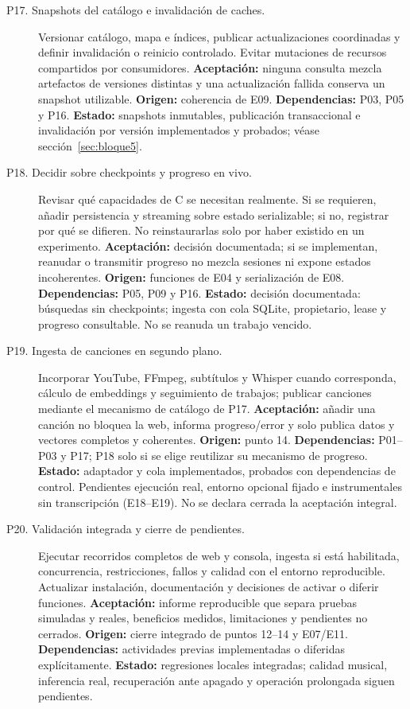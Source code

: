 \begin{description}
\item[P17. Snapshots del catálogo e invalidación de caches.]
Versionar catálogo, mapa e índices, publicar actualizaciones coordinadas y
definir invalidación o reinicio controlado. Evitar mutaciones de recursos
compartidos por consumidores.
\textbf{Aceptación:} ninguna consulta mezcla artefactos de versiones distintas
y una actualización fallida conserva un snapshot utilizable.
\textbf{Origen:} coherencia de E09. \textbf{Dependencias:} P03, P05 y P16.
\textbf{Estado:} snapshots inmutables, publicación transaccional e invalidación por
versión implementados y probados; véase sección~\ref{sec:bloque5}.

\item[P18. Decidir sobre checkpoints y progreso en vivo.]
Revisar qué capacidades de C se necesitan realmente. Si se requieren, añadir
persistencia y streaming sobre estado serializable; si no, registrar por qué
se difieren. No reinstaurarlas solo por haber existido en un experimento.
\textbf{Aceptación:} decisión documentada; si se implementan, reanudar o
transmitir progreso no mezcla sesiones ni expone estados incoherentes.
\textbf{Origen:} funciones de E04 y serialización de E08.
\textbf{Dependencias:} P05, P09 y P16.
\textbf{Estado:} decisión documentada: búsquedas sin checkpoints; ingesta con cola
SQLite, propietario, lease y progreso consultable. No se reanuda un trabajo vencido.

\item[P19. Ingesta de canciones en segundo plano.]
Incorporar YouTube, FFmpeg, subtítulos y Whisper cuando corresponda, cálculo de
embeddings y seguimiento de trabajos; publicar canciones mediante el mecanismo
de catálogo de P17.
\textbf{Aceptación:} añadir una canción no bloquea la web, informa progreso/error
y solo publica datos y vectores completos y coherentes.
\textbf{Origen:} punto 14. \textbf{Dependencias:} P01--P03 y P17;
P18 solo si se elige reutilizar su mecanismo de progreso.
\textbf{Estado:} adaptador y cola implementados, probados con dependencias de
control. Pendientes ejecución real, entorno opcional fijado e instrumentales sin
transcripción (E18--E19). No se declara cerrada la aceptación integral.

\item[P20. Validación integrada y cierre de pendientes.]
Ejecutar recorridos completos de web y consola, ingesta si está habilitada,
concurrencia, restricciones, fallos y calidad con el entorno reproducible.
Actualizar instalación, documentación y decisiones de activar o diferir funciones.
\textbf{Aceptación:} informe reproducible que separa pruebas simuladas y reales,
beneficios medidos, limitaciones y pendientes no cerrados.
\textbf{Origen:} cierre integrado de puntos 12--14 y E07/E11.
\textbf{Dependencias:} actividades previas implementadas o diferidas explícitamente.
\textbf{Estado:} regresiones locales integradas; calidad musical, inferencia real,
recuperación ante apagado y operación prolongada siguen pendientes.
\end{description}

